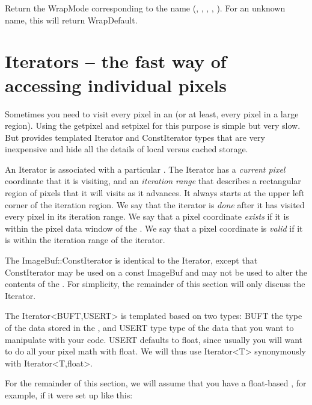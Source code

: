 Return the {\cf WrapMode} corresponding to the name (,
, , , ). For an unknown
name, this will return {\cf WrapDefault}.
\apiend



\section{Iterators -- the fast way of accessing individual pixels}

Sometimes you need to visit every pixel in an \ImageBuf (or at least,
every pixel in a large region).  Using the {\cf getpixel} and {\cf
  setpixel} for this purpose is simple but very slow.  But \ImageBuf
provides templated {\cf Iterator} and {\cf ConstIterator} types
that are very inexpensive and hide all the details of local versus
cached storage.

An {\cf Iterator} is associated with a particular \ImageBuf.  
The {\cf Iterator} has a \emph{current pixel} coordinate that it is
visiting, and an \emph{iteration range} that describes a rectangular
region of pixels that it will visits as it advances.  It always starts
at the upper left corner of the iteration region.  We say that
the iterator is \emph{done} after it has visited every pixel in its
iteration range.  We say that a pixel coordinate \emph{exists} if it is
within the pixel data window of the \ImageBuf.  We say that a pixel
coordinate is \emph{valid} if it is within the iteration range of the
iterator.

The {\cf ImageBuf::ConstIterator} is identical to the {\cf Iterator},
except that {\cf ConstIterator} may be used on a {\cf const ImageBuf}
and may not be used to alter the contents of the \ImageBuf.  For 
simplicity, the remainder of this section will only discuss the 
{\cf Iterator}.

The {\cf Iterator<BUFT,USERT>} is templated based on two types: {\cf
  BUFT} the type of the data stored in the \ImageBuf, and {\cf USERT}
type type of the data that you want to manipulate with your code.  {\cf
  USERT} defaults to {\cf float}, since usually you will want to do all
your pixel math with {\cf float}.  We will thus use {\cf Iterator<T>}
synonymously with {\cf Iterator<T,float>}.

For the remainder of this section, we will assume that you have a
{\cf float}-based \ImageBuf, for example, if it were set up like this:

